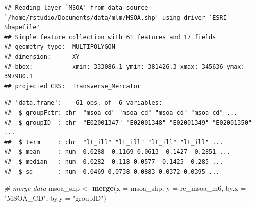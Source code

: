 \documentclass[
]{book}
\newenvironment{Shaded}{\begin{snugshade}}{\end{snugshade}}
\newcommand{\CommentTok}[1]{\textcolor[rgb]{0.56,0.35,0.01}{\textit{#1}}}
\newcommand{\DataTypeTok}[1]{\textcolor[rgb]{0.13,0.29,0.53}{#1}}
\newcommand{\KeywordTok}[1]{\textcolor[rgb]{0.13,0.29,0.53}{\textbf{#1}}}
\newcommand{\NormalTok}[1]{#1}
\newcommand{\OperatorTok}[1]{\textcolor[rgb]{0.81,0.36,0.00}{\textbf{#1}}}
\newcommand{\StringTok}[1]{\textcolor[rgb]{0.31,0.60,0.02}{#1}}
\begin{document}
\begin{verbatim}
## Reading layer `MSOA' from data source `/home/rstudio/Documents/data/mlm/MSOA.shp' using driver `ESRI Shapefile'
## Simple feature collection with 61 features and 17 fields
## geometry type:  MULTIPOLYGON
## dimension:      XY
## bbox:           xmin: 333086.1 ymin: 381426.3 xmax: 345636 ymax: 397980.1
## projected CRS:  Transverse_Mercator
\end{verbatim}

\begin{Shaded}
\end{Shaded}

\begin{verbatim}
## 'data.frame':    61 obs. of  6 variables:
##  $ groupFctr: chr  "msoa_cd" "msoa_cd" "msoa_cd" "msoa_cd" ...
##  $ groupID  : chr  "E02001347" "E02001348" "E02001349" "E02001350" ...
##  $ term     : chr  "lt_ill" "lt_ill" "lt_ill" "lt_ill" ...
##  $ mean     : num  0.0288 -0.1169 0.0613 -0.1427 -0.2851 ...
##  $ median   : num  0.0282 -0.118 0.0577 -0.1425 -0.285 ...
##  $ sd       : num  0.0469 0.0738 0.0883 0.0372 0.0395 ...
\end{verbatim}

\begin{Shaded}
\begin{Highlighting}[]
\CommentTok{# merge data}
\NormalTok{msoa_shp <-}\StringTok{ }\KeywordTok{merge}\NormalTok{(}\DataTypeTok{x =}\NormalTok{ msoa_shp, }\DataTypeTok{y =}\NormalTok{ re_msoa_m6, }\DataTypeTok{by.x =} \StringTok{"MSOA_CD"}\NormalTok{, }\DataTypeTok{by.y =} \StringTok{"groupID"}\NormalTok{)}
\end{Highlighting}
\end{Shaded}
\end{document}
